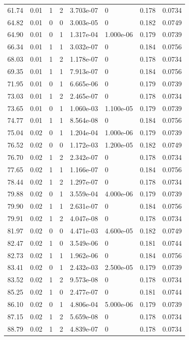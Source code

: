 \documentclass[preview]{standalone}
\begin{document}
{{{\begin{tabular}{L{1.2cm}C{1.2cm} C{0.3cm}C{0.5cm} C{1.4cm}C{1.4cm} C{1.4cm}C{1.4cm}}
  61.74  &  0.01  & 1     &  2 &  3.703e-07  & 0  & 0.178 &  0.0734   \\ 
  64.82  &  0.01  & 0     &  0 &  3.003e-05  & 0  & 0.182 &  0.0749   \\ 
  64.90  &  0.01  & 0     &  1 &  1.317e-04  & 1.000e-06  & 0.179 &  0.0739   \\ 
  66.34  &  0.01  & 1     &  1 &  3.032e-07  & 0  & 0.184 &  0.0756   \\ 
  68.03  &  0.01  & 1     &  2 &  1.178e-07  & 0  & 0.178 &  0.0734   \\ 
  69.35  &  0.01  & 1     &  1 &  7.913e-07  & 0  & 0.184 &  0.0756   \\ 
  71.95  &  0.01  & 0     &  1 &  6.665e-06  & 0  & 0.179 &  0.0739   \\ 
  73.03  &  0.01  & 1     &  2 &  2.465e-07  & 0  & 0.178 &  0.0734   \\ 
  73.65  &  0.01  & 0     &  1 &  1.060e-03  & 1.100e-05  & 0.179 &  0.0739   \\ 
  74.77  &  0.01  & 1     &  1 &  8.564e-08  & 0  & 0.184 &  0.0756   \\ 
  75.04  &  0.02  & 0     &  1 &  1.204e-04  & 1.000e-06  & 0.179 &  0.0739   \\ 
  76.52  &  0.02  & 0     &  0 &  1.172e-03  & 1.200e-05  & 0.182 &  0.0749   \\ 
  76.70  &  0.02  & 1     &  2 &  2.342e-07  & 0  & 0.178 &  0.0734   \\ 
  77.65  &  0.02  & 1     &  1 &  1.166e-07  & 0  & 0.184 &  0.0756   \\ 
  78.44  &  0.02  & 1     &  2 &  1.297e-07  & 0  & 0.178 &  0.0734   \\ 
  79.88  &  0.02  & 0     &  1 &  3.559e-04  & 4.000e-06  & 0.179 &  0.0739   \\ 
  79.90  &  0.02  & 1     &  1 &  2.631e-07  & 0  & 0.184 &  0.0756   \\ 
  79.91  &  0.02  & 1     &  2 &  4.047e-08  & 0  & 0.178 &  0.0734   \\ 
  81.97  &  0.02  & 0     &  0 &  4.471e-03  & 4.600e-05  & 0.182 &  0.0749   \\ 
  82.47  &  0.02  & 1     &  0 &  3.549e-06  & 0  & 0.181 &  0.0744   \\ 
  82.73  &  0.02  & 1     &  1 &  1.962e-06  & 0  & 0.184 &  0.0756   \\ 
  83.41  &  0.02  & 0     &  1 &  2.432e-03  & 2.500e-05  & 0.179 &  0.0739   \\ 
  83.52  &  0.02  & 1     &  2 &  9.573e-08  & 0  & 0.178 &  0.0734   \\ 
  85.25  &  0.02  & 1     &  0 &  2.477e-07  & 0  & 0.181 &  0.0744   \\ 
  86.10  &  0.02  & 0     &  1 &  4.806e-04  & 5.000e-06  & 0.179 &  0.0739   \\ 
  87.15  &  0.02  & 1     &  2 &  5.659e-08  & 0  & 0.178 &  0.0734   \\ 
  88.79  &  0.02  & 1     &  2 &  4.839e-07  & 0  & 0.178 &  0.0734   \\ 
\hline 
\end{tabular} 

}}}
\end{document}
